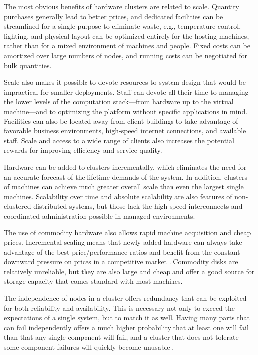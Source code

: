 The most obvious benefits of hardware clusters are related to scale. Quantity purchases generally lead to better prices, and dedicated facilities can be streamlined for a single purpose to eliminate waste, e.g., temperature control, lighting, and physical layout can be optimized entirely for the hosting machines, rather than for a mixed environment of machines and people. Fixed costs can be amortized over large numbers of nodes, and running costs can be negotiated for bulk quantities.

Scale also makes it possible to devote resources to system design that would be impractical for smaller deployments. Staff can devote all their time to managing the lower levels of the computation stack---from hardware up to the virtual machine---and to optimizing the platform without specific applications in mind. Facilities can also be located away from client buildings to take advantage of favorable business environments, high-speed internet connections, and available staff. Scale and access to a wide range of clients also increases the potential rewards for improving efficiency and service quality.

Hardware can be added to clusters incrementally, which eliminates the need for an accurate forecast of the lifetime demands of the system. In addition, clusters of machines can achieve much greater overall scale than even the largest single machines. Scalability over time and absolute scalability are also features of non-clustered distributed systems, but those lack the high-speed interconnects and coordinated administration possible in managed environments.

The use of commodity hardware also allows rapid machine acquisition and cheap prices. Incremental scaling means that newly added hardware can always take advantage of the best price/performance ratios and benefit from the constant downward pressure on prices in a competitive market \cite{fox}. Commodity disks are relatively unreliable, but they are also large and cheap and offer a good source for storage capacity \cite{patterson,warfield} that comes standard with most machines.

The independence of nodes in a cluster offers redundancy that can be exploited for both reliability and availability. This is necessary not only to exceed the expectations of a single system, but to match it as well. Having many parts that can fail independently offers a much higher probability that at least one will fail than that any single component will fail, and a cluster that does not tolerate some component failures will quickly become unusable \cite{birrell93}.

